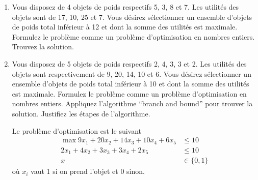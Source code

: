 \begin{enumerate}
  \item Vous disposez de 4 objets de poids respectifs 5, 3, 8 et 7. Les utilités des
    objets sont de 17, 10, 25 et 7. Vous désirez sélectionner un ensemble d'objets de poids total inférieur  à 12 et dont la somme
    des utilités est maximale.  Formulez le problème comme un problème d'optimisation en nombres entiers. Trouvez la solution.



  \item Vous disposez de 5 objets de poids respectifs 2, 4, 3, 3 et 2. Les
    utilités des objets sont respectivement de 9, 20, 14, 10 et 6. Vous désirez
    sélectionner un ensemble d'objets de poids total inférieur  à 10
    et dont la somme des utilités est maximale.  Formulez le problème
    comme un problème d'optimisation en nombres entiers. Appliquez l'algorithme ``branch and bound'' pour trouver la
    solution. Justifiez les étapes de l'algorithme.

    \begin{solution}
      Le problème d'optimisation est le suivant
      \begin{align*}
        \max 9x_1 + 20x_2 + 14x_3 + 10x_4 + 6x_5 & \leq 10\\
        2x_1 + 4x_2 + 3x_3 + 3x_4 + 2x_5 & \leq 10\\
        x & \in \{0,1\}
      \end{align*}
      où $x_i$ vaut 1 si on prend l'objet et 0 sinon.


\end{solution}
\end{enumerate}
